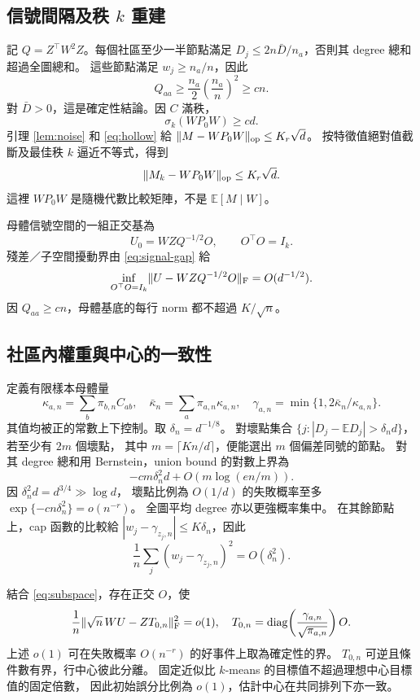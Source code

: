 \documentclass[11pt,a4paper]{article}
\theoremstyle{zhplain}
\numberwithin{equation}{section}
\newcommand{\E}{\mathbb E}
\newcommand{\diag}{\operatorname{diag}}
\newcommand{\op}{\mathrm{op}}
\newcommand{\Frob}{\mathrm{F}}
\DeclarePairedDelimiter{\norm}{\lVert}{\rVert}
\begin{document}
\subsection{信號間隔及秩 \texorpdfstring{\(k\)}{k} 重建}
記 \(Q=Z^\top W^2Z\)。每個社區至少一半節點滿足
\(D_j\le2n\bar D/n_a\)，否則其 degree 總和超過全圖總和。
這些節點滿足 \(w_j\ge n_a/n\)，因此
\[
 Q_{aa}\ge\frac{n_a}{2}\left(\frac{n_a}{n}\right)^2\ge cn.
\]
對 \(\bar D>0\)，這是確定性結論。因 \(C\) 滿秩，
\begin{equation}
 \sigma_k(WP_0W)\ge cd.
 \label{eq:signal-gap}
\end{equation}
引理 \ref{lem:noise} 和 \eqref{eq:hollow} 給
\(\norm{M-WP_0W}_{\op}\le K_r\sqrt d\)。
按特徵值絕對值截斷及最佳秩 \(k\) 逼近不等式，得到
\begin{equation}
 \norm{M_k-WP_0W}_{\op}\le K_r\sqrt d.
 \label{eq:rankk-noise}
\end{equation}
這裡 \(WP_0W\) 是隨機代數比較矩陣，不是 \(\E[M\mid W]\)。

母體信號空間的一組正交基為
\[
 U_0=WZQ^{-1/2}O,\qquad O^\top O=I_k.
\]
殘差／子空間擾動界由 \eqref{eq:signal-gap} 給
\begin{equation}
 \inf_{O^\top O=I_k}
 \norm{U-WZQ^{-1/2}O}_{\Frob}=O(d^{-1/2}).
 \label{eq:subspace}
\end{equation}
因 \(Q_{aa}\ge cn\)，母體基底的每行 norm 都不超過 \(K/\sqrt n\)。

\subsection{社區內權重與中心的一致性}
定義有限樣本母體量
\[
 \kappa_{a,n}=\sum_b\pi_{b,n}C_{ab},\quad
 \bar\kappa_n=\sum_a\pi_{a,n}\kappa_{a,n},\quad
 \gamma_{a,n}=\min\{1,2\bar\kappa_n/\kappa_{a,n}\}.
\]
其值均被正的常數上下控制。取 \(\delta_n=d^{-1/8}\)。
對壞點集合
\(\{j:|D_j-\E D_j|>\delta_n d\}\)，若至少有 \(2m\) 個壞點，
其中 \(m=\lceil Kn/d\rceil\)，便能選出 \(m\) 個偏差同號的節點。
對其 degree 總和用 Bernstein，union bound 的對數上界為
\[
 -cm\delta_n^2d+O(m\log(en/m)).
\]
因 \(\delta_n^2d=d^{3/4}\gg\log d\)，
壞點比例為 \(O(1/d)\) 的失敗概率至多
\(\exp\{-cn\delta_n^2\}=o(n^{-r})\)。
全圖平均 degree 亦以更強概率集中。
在其餘節點上，cap 函數的比較給
\(|w_j-\gamma_{z_j,n}|\le K\delta_n\)，因此
\begin{equation}
 \frac1n\sum_j(w_j-\gamma_{z_j,n})^2=O(\delta_n^2).
 \label{eq:weight-consistency}
\end{equation}

結合 \eqref{eq:subspace}，存在正交 \(O\)，使
\begin{equation}
 \frac1n\norm{\sqrt n\,WU-ZT_{0,n}}_{\Frob}^2=o(1),
 \quad
 T_{0,n}=
 \diag\!\left(\frac{\gamma_{a,n}}{\sqrt{\pi_{a,n}}}\right)O.
 \label{eq:centroid-consistency}
\end{equation}
上述 \(o(1)\) 可在失敗概率 \(O(n^{-r})\) 的好事件上取為確定性的界。
\(T_{0,n}\) 可逆且條件數有界，行中心彼此分離。
固定近似比 \(k\)-means 的目標值不超過理想中心目標值的固定倍數，
因此初始誤分比例為 \(o(1)\)，估計中心在共同排列下亦一致。
\end{document}
